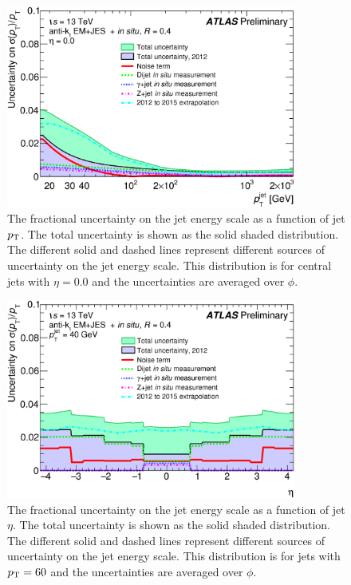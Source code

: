 \begin{figure}[!h]
\begin{center}
\includegraphics[width=0.85\textwidth]{figures/JetCalib/JER_pt.png}
\caption[The fractional uncertainty on the jet energy resolution vs jet $\pt$. ]{The fractional uncertainty on the jet energy scale as a function of jet $\pt$.  The total uncertainty is shown as the solid shaded distribution.  The different solid and dashed lines represent different sources of uncertainty on the jet energy scale. This distribution is for central jets with $\eta = 0.0$ and the uncertainties are averaged over $\phi$.}
\label{fig:sys:JER1}
\end{center}
\end{figure}

\begin{figure}[!h]
\begin{center}
\includegraphics[width=0.85\textwidth]{figures/JetCalib/JER_eta.png}
\caption[The fractional uncertainty on the jet energy resolution vs jet $\eta$. ]{The fractional uncertainty on the jet energy scale as a function of jet $\eta$.  The total uncertainty is shown as the solid shaded distribution.  The different solid and dashed lines represent different sources of uncertainty on the jet energy scale. This distribution is for jets with $p_{\mathrm{T}} = 60$ \gev and the uncertainties are averaged over $\phi$.}
\label{fig:sys:JER2}
\end{center}
\end{figure}

